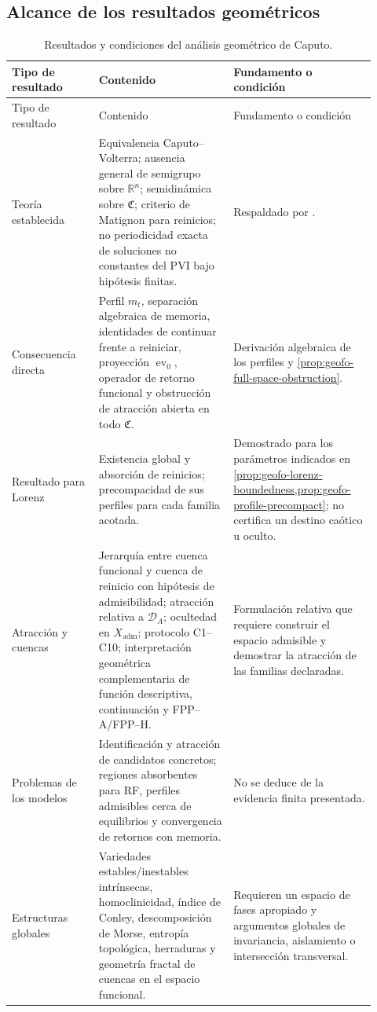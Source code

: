 \subsection{Alcance de los resultados geométricos}

\begin{longtable}{@{}L{0.22\linewidth}L{0.34\linewidth}L{0.36\linewidth}@{}}
\caption{Resultados y condiciones del análisis geométrico de Caputo.}
\label{tab:geofo-theory-boundary}\\
\toprule
Tipo de resultado & Contenido & Fundamento o condición \\
\midrule
\endfirsthead
\toprule
Tipo de resultado & Contenido & Fundamento o condición \\
\midrule
\endhead
Teoría establecida & Equivalencia Caputo--Volterra; ausencia general de
semigrupo sobre \(\mathbb R^n\); semidinámica sobre \(\mathfrak C\); criterio
de Matignon para reinicios; no periodicidad exacta de soluciones no constantes
del PVI bajo hipótesis finitas. &
Respaldado por
\cite{Matignon1996,CongTuan2017Nonlocal,DoanKloeden2021Semidynamical,
TavazoeiHaeri2009,KaslikSivasundaram2012}.\\
Consecuencia directa & Perfil \(m_t\), separación algebraica de memoria,
identidades de continuar frente a reiniciar, proyección
\(\operatorname{ev}_0\), operador de retorno funcional y obstrucción de
atracción abierta en todo \(\mathfrak C\). &
Derivación algebraica de los perfiles y
\cref{prop:geofo-full-space-obstruction}.\\
Resultado para Lorenz & Existencia global y absorción de reinicios;
precompacidad de sus perfiles para cada familia acotada. &
Demostrado para los parámetros indicados en
\cref{prop:geofo-lorenz-boundedness,prop:geofo-profile-precompact}; no
certifica un destino caótico u oculto.\\
Atracción y cuencas & Jerarquía entre cuenca funcional y cuenca de
reinicio con hipótesis de admisibilidad; atracción relativa a
\(\mathcal D_A\); ocultedad en \(X_{\mathrm{adm}}\); protocolo C1--C10;
interpretación geométrica complementaria de función descriptiva, continuación y
FPP--A/FPP--H. &
Formulación relativa que requiere construir el espacio admisible y demostrar
la atracción de las familias declaradas.\\
Problemas de los modelos & Identificación y atracción de candidatos concretos;
regiones absorbentes para RF, perfiles admisibles cerca de
equilibrios y convergencia de retornos con memoria. &
No se deduce de la evidencia finita presentada.\\
Estructuras globales & Variedades estables/inestables intrínsecas,
homoclinicidad, índice de Conley, descomposición de Morse, entropía topológica,
herraduras y geometría fractal de cuencas en el espacio funcional. &
Requieren un espacio de fases apropiado y argumentos globales de invariancia,
aislamiento o intersección transversal.\\
\bottomrule
\end{longtable}

